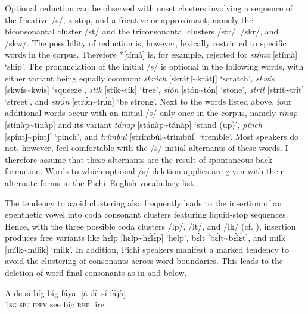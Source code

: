 Optional reduction can be observed with onset clusters involving a sequence of the fricative /s/, a stop, and a fricative or approximant, namely the biconsonantal cluster /st/ and the triconsonantal clusters /str/, /skr/, and /skw/. The possibility of reduction is, however, lexically restricted to specific words in the corpus. Therefore *[tímà] is, for example, rejected for \textit{stíma} [stímà] ‘ship’. The pronunciation of the initial /s/ is optional in the following words, with either variant being equally common: \textit{skrách} [skrátʃ{\textasciitilde}krátʃ] ‘scratch’,\textit{ skwís} [skwís{\textasciitilde}kwís] ‘squeeze’, \textit{stík} [stík{\textasciitilde}tík] ‘tree’, \textit{stón} [stón{\textasciitilde}tón] ‘stone’, \textit{strít} [strít{\textasciitilde}trít] ‘street’, and \textit{strɔ́n} [strɔ́n{\textasciitilde}trɔ́n] ‘be strong’. Next to the words listed above, four additional words occur with an initial /s/ only once in the corpus, namely \textit{tínap} [stínàp{\textasciitilde}tínàp] and its variant \textit{tánap} [stánàp{\textasciitilde}tánàp] ‘stand (up)’, \textit{pínch} [spíntʃ{\textasciitilde}píntʃ] ‘pinch’, and \textit{trímbul} [strímbùl{\textasciitilde}trímbùl] ‘tremble’. Most speakers do not, however, feel comfortable with the /s/-initial alternants of these words. I therefore assume that these alternants are the result of spontaneous back-formation. Words to which optional /s/ deletion applies are given with their alternate forms in the Pichi–English vocabulary list.



The tendency to avoid clustering also frequently leads to the insertion of an epenthetic vowel into coda consonant clusters featuring liquid-stop sequences. Hence, with the three possible coda clusters /lp/, /lt/, and /lk/ (cf. ), insertion produces free variants like hɛ́lp [hɛ́lp{\textasciitilde}hɛ́lɛ̀p] ‘help’, bɛ́lt [bɛ́lt{\textasciitilde}bɛ́lɛ̀t], and milk [mílk{\textasciitilde}mílìk] ‘milk’. In addition, Pichi speakers manifest a marked tendency to avoid the clustering of consonants across word boundaries. This leads to the deletion of word-final consonants as in  and  below. 



\ea%
    \label{ex:key:39}
    \gll   A    de  sí    bíg  bíg  fáya.      [à  dè  sí      fájà]\\
\textsc{1sg.sbj}  \textsc{ipfv}  see    big  \textsc{rep}  fire\\

